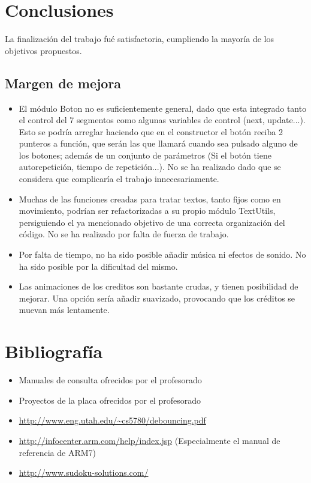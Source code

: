 \documentclass[12pt,letterpaper]{article}
\begin{document}
\section{Conclusiones}
La finalización del trabajo fué satisfactoria, cumpliendo la mayoría
de los objetivos propuestos.


\subsection{Margen de mejora}
\label{sec:mejora}
\begin{itemize}
  \item El módulo Boton no es suficientemente general, dado que esta
    integrado tanto el control del 7 segmentos como algunas variables
    de control (next, update...). Esto se podría arreglar haciendo que
    en el constructor el botón reciba 2 punteros a función, que serán
    las que llamará cuando sea pulsado alguno de los botones; además
    de un conjunto de parámetros (Si el botón tiene autorepetición,
    tiempo de repetición...). No se ha realizado dado que se considera
    que complicaría el trabajo innecesariamente.
  \item Muchas de las funciones creadas para tratar textos, tanto
    fijos como en movimiento, podrían ser refactorizadas a su propio
    módulo TextUtils, persiguiendo el ya mencionado objetivo de una
    correcta organización del código. No se ha realizado por falta de
    fuerza de trabajo.
  \item Por falta de tiempo, no ha sido posible añadir música ni
    efectos de sonido. No ha sido posible por la dificultad del mismo.
  \item Las animaciones de los creditos son bastante crudas, y tienen
    posibilidad de mejorar. Una opción sería añadir suavizado,
    provocando que los créditos se muevan más lentamente.
\end{itemize}
\clearpage
\section{Bibliografía}
\begin{itemize}
  \item Manuales de consulta ofrecidos por el profesorado
  \item Proyectos de la placa ofrecidos por el profesorado
  \item \url{http://www.eng.utah.edu/~cs5780/debouncing.pdf}
  \item \url{http://infocenter.arm.com/help/index.jsp} (Especialmente el
    manual de referencia de ARM7)
  \item \url{http://www.sudoku-solutions.com/}
\end{itemize}
\end{document}
